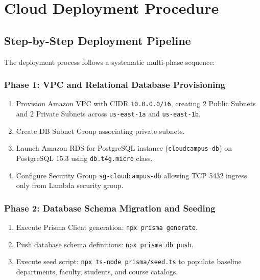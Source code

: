 \chapter{Cloud Deployment Procedure}
\label{chap:deployment}

\section{Step-by-Step Deployment Pipeline}
The deployment process follows a systematic multi-phase sequence:

\subsection{Phase 1: VPC and Relational Database Provisioning}
\begin{enumerate}
    \item Provision Amazon VPC with CIDR \texttt{10.0.0.0/16}, creating 2 Public Subnets and 2 Private Subnets across \texttt{us-east-1a} and \texttt{us-east-1b}.
    \item Create DB Subnet Group associating private subnets.
    \item Launch Amazon RDS for PostgreSQL instance (\texttt{cloudcampus-db}) on PostgreSQL 15.3 using \texttt{db.t4g.micro} class.
    \item Configure Security Group \texttt{sg-cloudcampus-db} allowing TCP 5432 ingress only from Lambda security group.
\end{enumerate}

\subsection{Phase 2: Database Schema Migration and Seeding}
\begin{enumerate}
    \item Execute Prisma Client generation: \texttt{npx prisma generate}.
    \item Push database schema definitions: \texttt{npx prisma db push}.
    \item Execute seed script: \texttt{npx ts-node prisma/seed.ts} to populate baseline departments, faculty, students, and course catalogs.
\end{enumerate}

